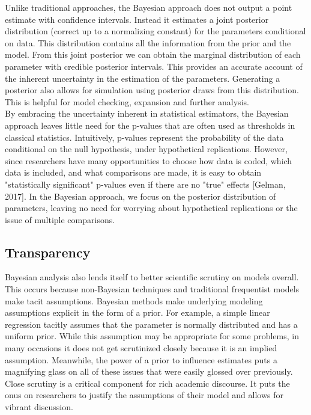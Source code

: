 \documentclass{article}
\begin{document}
Unlike traditional approaches, the Bayesian approach does not output a point estimate with confidence intervals. Instead it estimates a joint posterior distribution (correct up to a normalizing constant) for the parameters conditional on data. This distribution contains all the information from the prior and the model. From this joint posterior we can obtain the marginal distribution of each parameter with credible posterior intervals. This provides an accurate account of the inherent uncertainty in the estimation of the parameters. Generating a posterior also allows for simulation using posterior draws from this distribution. This is helpful for model checking, expansion and further analysis. \\
By embracing the uncertainty inherent in statistical estimators, the Bayesian approach leaves little need for the p-values that are often used as thresholds in classical statistics.  Intuitively, p-values represent the probability of the data conditional on the null hypothesis, under hypothetical replications.  However, since researchers have many opportunities to choose how data is coded, which data is included, and what comparisons are made, it is easy to obtain "statistically significant" p-values even if there are no "true" effects [Gelman, 2017].  In the Bayesian approach, we focus on the posterior distribution of parameters, leaving no need for worrying about hypothetical replications or the issue of multiple comparisons.

\subsection{Transparency}
Bayesian analysis also lends itself to better scientific scrutiny on models overall. This occurs because non-Bayesian techniques and traditional frequentist models make tacit assumptions. Bayesian methods make underlying modeling assumptions explicit in the form of a prior. For example, a simple linear regression tacitly assumes that the parameter is normally distributed and has a uniform prior. While this assumption may be appropriate for some problems, in many occasions it does not get scrutinized closely because it is an implied assumption. Meanwhile, the power of a prior to influence estimates puts a magnifying glass on all of these issues that were easily glossed over previously.  Close scrutiny is a critical component for rich academic discourse. It puts the onus on researchers to justify the assumptions of their model and allows for vibrant discussion. 
\end{document}
